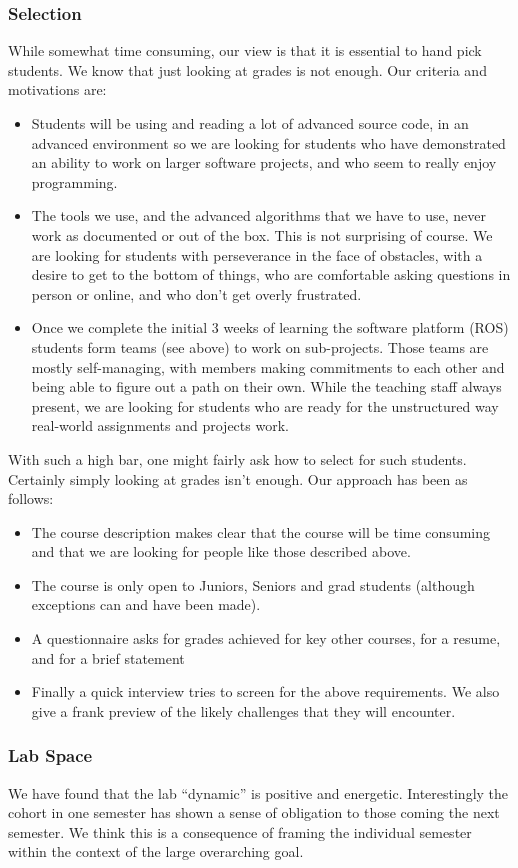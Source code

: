\subsubsection{Selection}While somewhat time consuming, our view is that it is essential to hand pick students. We know that just looking at grades is not enough.  Our criteria and motivations are:
\begin{itemize}
\item Students will be using and reading a lot of advanced source code, in an advanced environment so we are looking for students who have demonstrated an ability to work on larger software projects, and who seem to really enjoy programming.
\item The tools we use, and the advanced algorithms that we have to use, never work as documented or out of the box. This is not surprising of course. We are looking for students with perseverance in the face of obstacles, with a desire to get to the bottom of things, who are comfortable asking questions in person or online, and who don't get overly frustrated.
\item Once we complete the initial 3 weeks of learning the software platform (ROS) students form teams (see above) to work on sub-projects. Those teams are mostly self-managing, with members making commitments to each other and being able to figure out a path on their own. While the teaching staff always present, we are looking for students who are ready for the unstructured way real-world assignments and projects work.
\end{itemize}
With such a high bar, one might fairly ask how to select for such students. Certainly simply looking at grades isn't enough. Our approach has been as follows: 
\begin{itemize}
\item The course description makes clear that the course will be time consuming and that we are looking for people like those described above.
\item The course is only open to Juniors, Seniors and grad students (although exceptions can and have been made).
\item A questionnaire asks for grades achieved for key other courses, for a resume, and for a brief statement
\item Finally a quick interview tries to screen for the above requirements.  We also give a frank preview of the likely challenges that they will encounter.
\end{itemize}
\subsubsection{Lab Space} We have found that the lab ``dynamic'' is positive and energetic. Interestingly the cohort in one semester has shown a sense of obligation to those coming the next semester. We think this is a consequence of framing the individual semester within the context of the large overarching goal.
